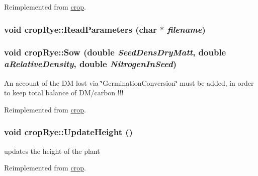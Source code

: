 Reimplemented from \hyperlink{classcrop_a602622ac2c0de6432e6b9438dbbb646b}{crop}.\hypertarget{classcrop_rye_aed534e2eb483b8bdd49bb3634492050c}{
\subsubsection[{ReadParameters}]{\setlength{\rightskip}{0pt plus 5cm}void cropRye::ReadParameters (char $\ast$ {\em filename})}}
\label{classcrop_rye_aed534e2eb483b8bdd49bb3634492050c}
\hypertarget{classcrop_rye_a0e583eca63fb8a2f609763d1a319d891}{
\subsubsection[{Sow}]{\setlength{\rightskip}{0pt plus 5cm}void cropRye::Sow (double {\em SeedDensDryMatt}, \/  double {\em aRelativeDensity}, \/  double {\em NitrogenInSeed})}}
\label{classcrop_rye_a0e583eca63fb8a2f609763d1a319d891}
An account of the DM lost via \char`\"{}GerminationConversion\char`\"{} must be added, in order to keep total balance of DM/carbon !!! 

Reimplemented from \hyperlink{classcrop_a2c5df235a96a1daa3ab122baf17518d4}{crop}.\hypertarget{classcrop_rye_ad2996d19a34c3a800f1f356b522b4904}{
\subsubsection[{UpdateHeight}]{\setlength{\rightskip}{0pt plus 5cm}void cropRye::UpdateHeight ()}}
\label{classcrop_rye_ad2996d19a34c3a800f1f356b522b4904}
updates the height of the plant 

Reimplemented from \hyperlink{classcrop_aeccf3077c6ad647769145b8064ba426b}{crop}.

